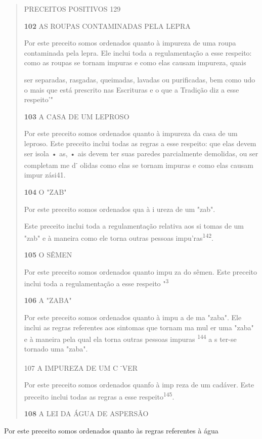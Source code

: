 \begin{quote}
PRECEITOS POSITIVOS 129

\textbf{102} AS ROUPAS CONTAMINADAS PELA LEPRA

Por este preceito somos ordenados quanto à impureza de uma rou­pa
contaminada pela lepra. Ele inclui toda a regulamentação a esse
respeito: co­mo as roupas se tornam impuras e como elas causam impureza,
quais

ser separadas, rasgadas, queimadas, lavadas ou purificadas, bem como udo
o mais que está prescrito nas Escrituras e o que a Tradição diz a esse
respeito'"

\textbf{103} A CASA DE UM LEPROSO

Por este preceito somos ordenados quanto à impureza da casa de um
leproso. Este preceito inclui todas as regras a esse respeito: que elas
devem ser isola • as, • ais devem ter suas paredes parcialmente
demolidas, ou ser com­pletam me d\textsuperscript{-} olidas como elas se
tornam impuras e como elas causam impur zási41.

\textbf{104} O "ZAB"

Por este preceito somos ordenados qua à i ureza de um "zab".

Este preceito inclui toda a regulamentação relativa aos si tomas de um
"zab" e à maneira como ele torna outras pessoas
impu'ras\textsuperscript{142}.

\textbf{105} O SÊMEN

Por este preceito somos ordenados quanto impu za do sêmen. Este preceito
inclui toda a regulamentação a esse respeito "\textsuperscript{3}

\textbf{106} A "ZABA"

Por este preceito somos ordenados quanto à impu a de ma "za­ba". Ele
inclui as regras referentes aos sintomas que tornam ma mul er uma "zaba"
e à maneira pela qual ela torna outras pessoas impuras
\textsuperscript{144} a s ter-se tornado uma "zaba".

107 A IMPUREZA DE UM C \textsuperscript{-}VER

Por este preceito somos ordenados quanfo à imp reza de um cadá­ver. Este
preceito inclui todas as regras a esse respeito\textsuperscript{145}.

\textbf{108} A LEI DA ÁGUA DE ASPERSÃO
\end{quote}

Por este preceito somos ordenados quanto às regras referentes à água

